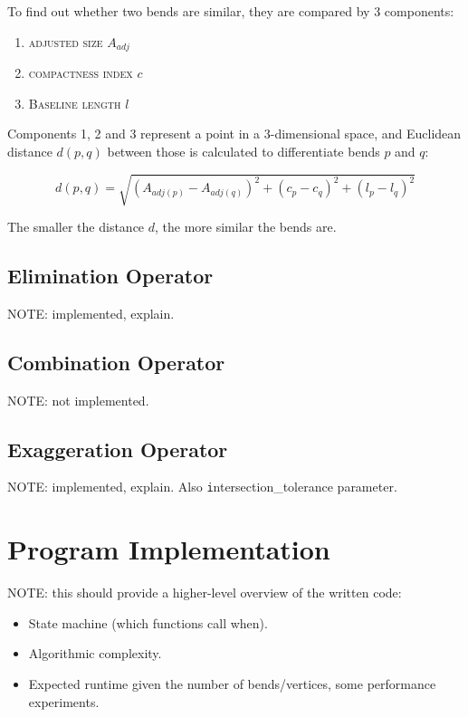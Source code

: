 \documentclass[a4paper]{article}
\begin{document}
To find out whether two bends are similar, they are compared by 3 components:

\begin{enumerate}
  \item \textsc{adjusted size} $A_{adj}$
  \item \textsc{compactness index} $c$
  \item \textsc{Baseline length} $l$
\end{enumerate}

Components 1, 2 and 3 represent a point in a 3-dimensional space, and Euclidean
distance $d(p,q)$ between those is calculated to differentiate bends $p$ and
$q$:

\[
  d(p,q) = \sqrt{(A_{adj(p)}-A_{adj(q)})^2 +
                   (c_p-c_q)^2 +
                   (l_p-l_q)^2}
\]

The smaller the distance $d$, the more similar the bends are.

\subsection{Elimination Operator}

NOTE: implemented, explain.

\subsection{Combination Operator}

NOTE: not implemented.

\subsection{Exaggeration Operator}

NOTE: implemented, explain. Also {\texttt intersection\_tolerance} parameter.

\section{Program Implementation}

NOTE: this should provide a higher-level overview of the written code:

\begin{itemize}
    \item State machine (which functions call when).
    \item Algorithmic complexity.
    \item Expected runtime given the number of bends/vertices, some performance
        experiments.
\end{itemize}
\end{document}
